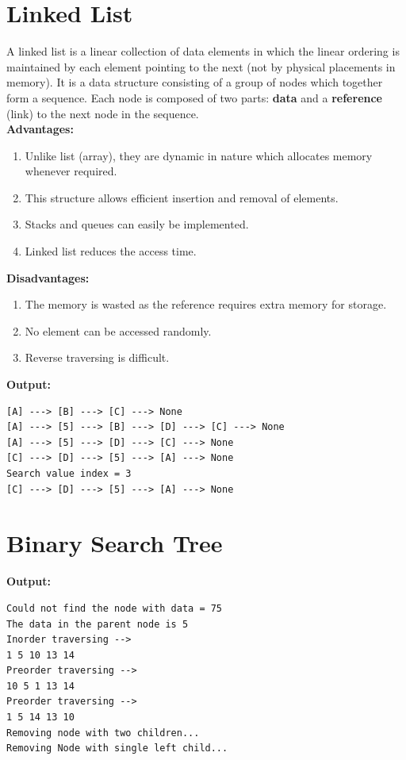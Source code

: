 \documentclass[12pt]{article}
\begin{document}
\newpage
\section{Linked List}

A linked list is a linear collection of data elements in which the linear ordering is maintained by each element pointing to the next (not by physical placements in memory). It is a data structure consisting of a group of nodes which together form a sequence. Each node is composed of two parts: \textbf{data} and a \textbf{reference} (link) to the next node in the sequence.\\

\textbf{Advantages:}
\begin{enumerate}
	\item Unlike list (array), they are dynamic in nature which allocates memory whenever required.
	\item This structure allows efficient insertion and removal of elements.
	\item Stacks and queues can easily be implemented.
	\item Linked list reduces the access time.
\end{enumerate}

\textbf{Disadvantages:}
\begin{enumerate}
	\item The memory is wasted as the reference requires extra memory for storage.
	\item No element can be accessed randomly.
	\item Reverse traversing is difficult.
\end{enumerate}



\textbf{Output:}
\begin{lstlisting}
[A] ---> [B] ---> [C] ---> None
[A] ---> [5] ---> [B] ---> [D] ---> [C] ---> None
[A] ---> [5] ---> [D] ---> [C] ---> None
[C] ---> [D] ---> [5] ---> [A] ---> None
Search value index = 3
[C] ---> [D] ---> [5] ---> [A] ---> None
\end{lstlisting}

\newpage
\section{Binary Search Tree}

\textbf{Output:}
\begin{lstlisting}
Could not find the node with data = 75
The data in the parent node is 5
Inorder traversing -->
1 5 10 13 14
Preorder traversing -->
10 5 1 13 14
Preorder traversing -->
1 5 14 13 10
Removing node with two children...
Removing Node with single left child...
\end{lstlisting}
\end{document}
